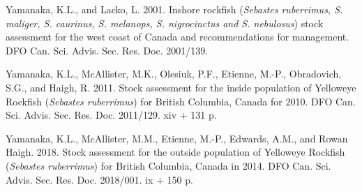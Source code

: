 \documentclass[11pt]{book}
\begin{document}
\leavevmode\hypertarget{ref-yamanaka2001}{}%
Yamanaka, K.L., and Lacko, L. 2001. Inshore rockfish (\emph{Sebastes ruberrimus, S. maliger, S. caurinus, S. melanops, S. nigrocinctus and S. nebulosus}) stock assessment for the west coast of Canada and recommendations for management. DFO Can. Sci. Advis. Sec. Res. Doc. 2001/139.

\leavevmode\hypertarget{ref-yamanaka2011}{}%
Yamanaka, K.L., McAllister, M.K., Olesiuk, P.F., Etienne, M.-P., Obradovich, S.G., and Haigh, R. 2011. Stock assessment for the inside population of Yelloweye Rockfish (\emph{Sebastes ruberrimus}) for British Columbia, Canada for 2010. DFO Can. Sci. Advis. Sec. Res. Doc. 2011/129. xiv + 131 p.

\leavevmode\hypertarget{ref-yamanaka2018yelloweyeoutside}{}%
Yamanaka, K.L., McAllister, M.M., Etienne, M.-P., Edwards, A.M., and Rowan Haigh. 2018. Stock assessment for the outside population of Yelloweye Rockfish (\emph{Sebastes ruberrimus}) for British Columbia, Canada in 2014. DFO Can. Sci. Advis. Sec. Res. Doc. 2018/001. ix + 150 p.
\end{document}
